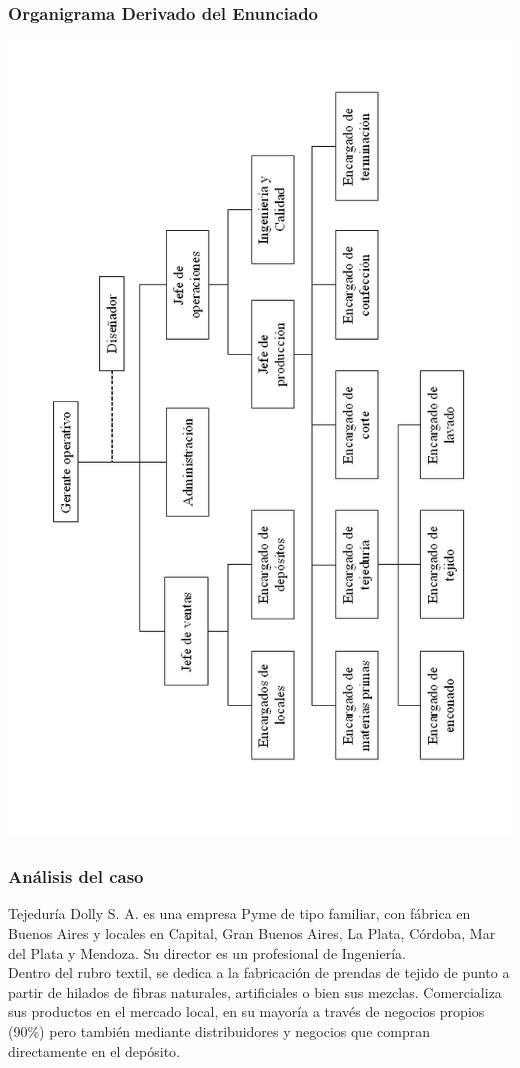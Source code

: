 \documentclass[a4paper,10pt,titlepage]{article}
\begin{document}
\subsubsection{Organigrama Derivado del Enunciado}
	\begin{center}
	\includegraphics[width=450pt]{./Organigramas/DollyOrganigrama.png}
	\end{center}


	\vspace{0.5cm}
\subsubsection{An\'{a}lisis del caso}

		\indent Tejedur\'{i}a Dolly S. A. es una empresa Pyme de tipo familiar, con f\'{a}brica en Buenos Aires y locales en Capital, Gran Buenos Aires, La Plata, C\'{o}rdoba, Mar del Plata y Mendoza. Su director es un profesional de Ingenier\'{i}a.\\
		\indent Dentro del rubro textil, se dedica a la fabricaci\'{o}n de prendas de tejido de punto a partir de hilados de fibras naturales, artificiales o bien sus mezclas. Comercializa sus productos en el mercado local, en su mayor\'{i}a a trav\'{e}s de negocios propios (90\%) pero tambi\'{e}n mediante distribuidores y negocios que compran directamente en el dep\'{o}sito.\\
		
\end{document}
